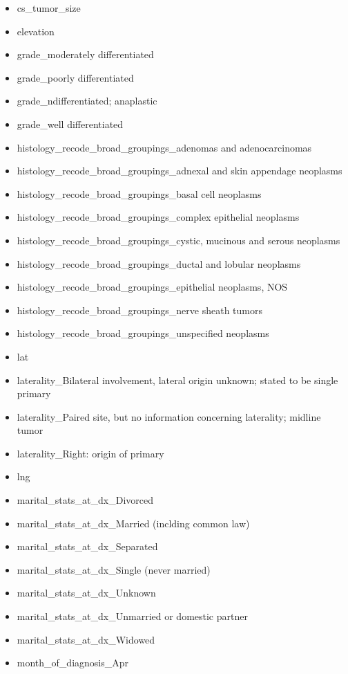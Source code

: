 \documentclass[a4paper,11pt]{article}
\begin{document}
\begin{itemize}[noitemsep]
\item cs\_tumor\_size
\item elevation
\item grade\_moderately differentiated
\item grade\_poorly differentiated
\item grade\_ndifferentiated; anaplastic
\item grade\_well differentiated
\item histology\_recode\_broad\_groupings\_adenomas and adenocarcinomas
\item histology\_recode\_broad\_groupings\_adnexal and skin appendage neoplasms
\item histology\_recode\_broad\_groupings\_basal cell neoplasms
\item histology\_recode\_broad\_groupings\_complex epithelial neoplasms
\item histology\_recode\_broad\_groupings\_cystic, mucinous and serous neoplasms
\item histology\_recode\_broad\_groupings\_ductal and lobular neoplasms
\item histology\_recode\_broad\_groupings\_epithelial neoplasms, NOS
\item histology\_recode\_broad\_groupings\_nerve sheath tumors
\item histology\_recode\_broad\_groupings\_unspecified neoplasms
\item lat
\item laterality\_Bilateral involvement, lateral origin unknown; stated to be single primary
\item laterality\_Paired site, but no information concerning laterality; midline tumor
\item laterality\_Right: origin of primary
\item lng
\item marital\_stats\_at\_dx\_Divorced
\item marital\_stats\_at\_dx\_Married (inclding common law)
\item marital\_stats\_at\_dx\_Separated
\item marital\_stats\_at\_dx\_Single (never married)
\item marital\_stats\_at\_dx\_Unknown
\item marital\_stats\_at\_dx\_Unmarried or domestic partner
\item marital\_stats\_at\_dx\_Widowed
\item month\_of\_diagnosis\_Apr

\end{itemize}
\end{document}
